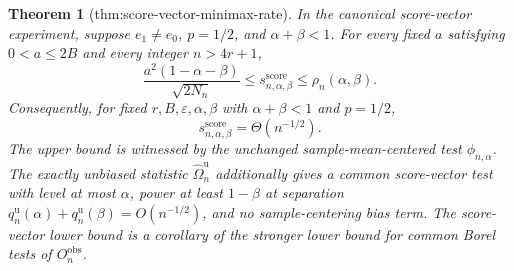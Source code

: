 \documentclass{article}
\newtheorem{theorem}{Theorem}
\begin{document}
\begin{theorem}[thm:score-vector-minimax-rate]\label{thm:score-vector-minimax-rate}
In the canonical score-vector experiment, suppose \(e_1\ne e_0\), \(p=1/2\), and \(\alpha+\beta<1\).  For every fixed \(a\) satisfying \(0<a\le2B\) and every integer \(n>4r+1\),
\[
 \frac{a^2(1-\alpha-\beta)}{\sqrt{2N_n}}
 \le s_{n,\alpha,\beta}^{\mathrm{score}}
 \le \rho_n(\alpha,\beta).
\]
Consequently, for fixed \(r,B,\varepsilon,\alpha,\beta\) with \(\alpha+\beta<1\) and \(p=1/2\),
\[
 s_{n,\alpha,\beta}^{\mathrm{score}}=\Theta(n^{-1/2}).
\]
The upper bound is witnessed by the unchanged sample-mean-centered test \(\phi_{n,\alpha}\).  The exactly unbiased statistic \(\widehat\Omega_n^{\mathrm u}\) additionally gives a common score-vector test with level at most \(\alpha\), power at least \(1-\beta\) at separation \(q_n^{\mathrm u}(\alpha)+q_n^{\mathrm u}(\beta)=O(n^{-1/2})\), and no sample-centering bias term.  The score-vector lower bound is a corollary of the stronger lower bound for common Borel tests of \(O_n^{\mathrm{obs}}\).
\end{theorem}
\end{document}
